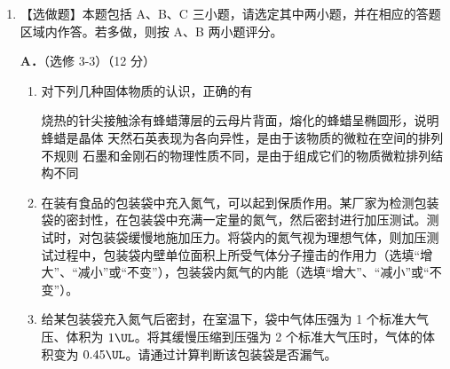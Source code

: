 \documentclass[\gkver]{gaokaozhenti}
\begin{document}
\begin{enumerate}
（3）分析上表的实验数据可知：在这段纸带记录的时间内，磁铁运动速度的变化情况是；磁铁受到阻尼作用的变化情况是。

（4）该同学将装置中的铜管更换为相同尺寸的塑料管，重复上述实验操作（记为“实验②”），结果表明磁铁下落的运动规律与自由落体运动规律几乎相同。请问实验②是为了说明什么？对比实验①和②的结果可得到什么结论？



\item
【选做题】本题包括 A、B、C 三小题，请选定其中两小题，并在相应的答题区域内作答。若多做，则按 A、B 两小题评分。

\textbf{A．}（选修 3-3）（12 分）

\begin{enumerate}
	\item
	对下列几种固体物质的认识，正确的有

	{烧热的针尖接触涂有蜂蜡薄层的云母片背面，熔化的蜂蜡呈椭圆形，说明蜂蜡是晶体}
	{天然石英表现为各向异性，是由于该物质的微粒在空间的排列不规则}
	{石墨和金刚石的物理性质不同，是由于组成它们的物质微粒排列结构不同}

	\item
	在装有食品的包装袋中充入氮气，可以起到保质作用。某厂家为检测包装袋的密封性，在包装袋中充满一定量的氮气，然后密封进行加压测试。测试时，对包装袋缓慢地施加压力。将袋内的氮气视为理想气体，则加压测试过程中，包装袋内壁单位面积上所受气体分子撞击的作用力（选填“增大”、“减小”或“不变”），包装袋内氮气的内能（选填“增大”、“减小”或“不变”）。

	\item
	给某包装袋充入氮气后密封，在室温下，袋中气体压强为 1 个标准大气压、体积为 $1\UL$。将其缓慢压缩到压强为 2 个标准大气压时，气体的体积变为 $0.45\UL$。请通过计算判断该包装袋是否漏气。


\end{enumerate}
\end{enumerate}
\end{document}
